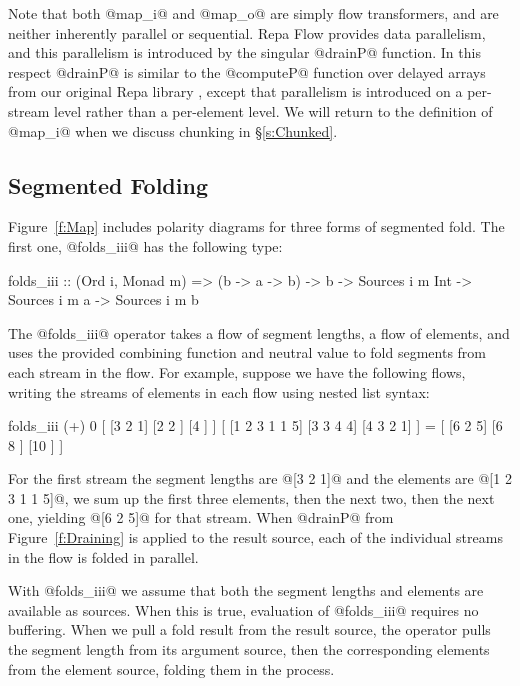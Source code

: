 Note that both @map_i@ and @map_o@ are simply flow transformers, and are neither inherently parallel or sequential. Repa Flow provides data parallelism, and this parallelism is introduced by the singular @drainP@ function. In this respect @drainP@ is similar to the @computeP@ function over delayed arrays from our original Repa library \cite{Lippmeier:Guiding}, except that parallelism is introduced on a per-stream level rather than a per-element level. We will return to the definition of @map_i@ when we discuss chunking in \S\ref{s:Chunked}.


\subsection{Segmented Folding}
Figure~\ref{f:Map} includes polarity diagrams for three forms of segmented fold. The first one, @folds_iii@ has the following type:
\begin{code}
folds_iii :: (Ord i, Monad m) => (b -> a -> b) -> b
          -> Sources i m Int  -> Sources i m a 
          -> Sources i m b
\end{code}

The @folds_iii@ operator takes a flow of segment lengths, a flow of elements, and uses the provided combining function and neutral value to fold segments from each stream in the flow. For example, suppose we have the following flows, writing the streams of elements in each flow using nested list syntax:
\begin{code}
folds_iii (+) 0 
   [ [3     2   1] [2   2  ] [4      ] ] 
   [ [1 2 3 1 1 5] [3 3 4 4] [4 3 2 1] ]
 = [ [6     2   5] [6   8  ] [10     ] ]
\end{code}

For the first stream the segment lengths are @[3 2 1]@ and the elements are @[1 2 3 1 1 5]@, we sum up the first three elements, then the next two, then the next one, yielding @[6 2 5]@ for that stream. When @drainP@ from Figure~\ref{f:Draining} is applied to the result source, each of the individual streams in the flow is folded in parallel. 

With @folds_iii@ we assume that both the segment lengths and elements are available as sources. When this is true, evaluation of @folds_iii@ requires no buffering. When we pull a fold result from the result source, the operator pulls the segment length from its argument source, then the corresponding elements from the element source, folding them in the process. 

